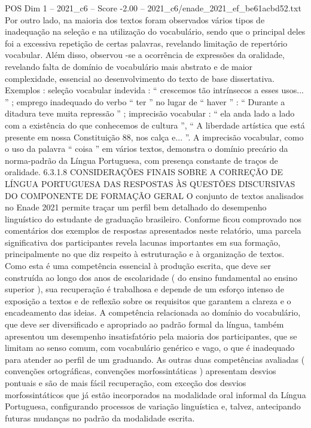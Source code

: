 \begin{textsample}{POS Dim 1 – 2021\_c6 – Score -2.00 – 2021\_c6/enade\_2021\_ef\_be61acbd52.txt}
Por outro lado, na maioria dos textos foram observados vários tipos de inadequação na seleção e na utilização do vocabulário, sendo que o principal deles foi a excessiva repetição de certas palavras, revelando limitação de repertório vocabular.
Além disso, observou -se a ocorrência de expressões da oralidade, revelando falta de domínio de vocabulário mais abstrato e de maior complexidade, essencial ao desenvolvimento do texto de base dissertativa.
Exemplos : seleção vocabular indevida : “ crescemos tão intrínsecos a esses usos... ” ; emprego inadequado do verbo “ ter ” no lugar de “ haver ” : “ Durante a ditadura teve muita repressão ” ; imprecisão vocabular : “ ela anda lado a lado com a existência do que conhecemos de cultura ”, “ A liberdade artística que está presente em nossa Constituição 88, nos calça e... ”.
A imprecisão vocabular, como o uso da palavra “ coisa ” em vários textos, demonstra o domínio precário da norma-padrão da Língua Portuguesa, com presença constante de traços de oralidade. 6.3.1.8 CONSIDERAÇÕES FINAIS SOBRE A CORREÇÃO DE LÍNGUA PORTUGUESA DAS RESPOSTAS ÀS QUESTÕES DISCURSIVAS DO COMPONENTE DE FORMAÇÃO GERAL O conjunto de textos analisados no Enade 2021 permite traçar um perfil bem detalhado do desempenho linguístico do estudante de graduação brasileiro.
Conforme ficou comprovado nos comentários dos exemplos de respostas apresentados neste relatório, uma parcela significativa dos participantes revela lacunas importantes em sua formação, principalmente no que diz respeito à estruturação e à organização de textos.
Como esta é uma competência essencial à produção escrita, que deve ser construída ao longo dos anos de escolaridade ( do ensino fundamental ao ensino superior ), sua recuperação é trabalhosa e depende de um esforço intenso de exposição a textos e de reflexão sobre os requisitos que garantem a clareza e o encadeamento das ideias.
A competência relacionada ao domínio do vocabulário, que deve ser diversificado e apropriado ao padrão formal da língua, também apresentou um desempenho insatisfatório pela maioria dos participantes, que se limitam ao senso comum, com vocabulário genérico e vago, o que é inadequado para atender ao perfil de um graduando.
As outras duas competências avaliadas ( convenções ortográficas, convenções morfossintáticas ) apresentam desvios pontuais e são de mais fácil recuperação, com exceção dos desvios morfossintáticos que já estão incorporados na modalidade oral informal da Língua Portuguesa, configurando processos de variação linguística e, talvez, antecipando futuras mudanças no padrão da modalidade escrita.

\end{textsample}
